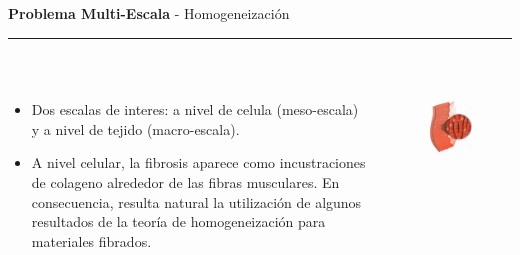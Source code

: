 \documentclass[11pt]{beamer}
\begin{document}
\begin{frame}[t]
	\vspace*{0.5 cm} \textbf{Problema Multi-Escala} - Homogeneización
	\color{brown}\rule{\linewidth}{4pt} \\ [0.2 cm]
	
	\begin{columns}[T] %
		\begin{column}{.8\textwidth}
		\begin{itemize}
			\item Dos escalas de interes: a nivel de celula (meso-escala) y a nivel de tejido (macro-escala).
			\item A nivel celular, la fibrosis aparece como incustraciones de colageno alrededor de las fibras musculares. En consecuencia, resulta natural la utilización de algunos resultados de la teoría de homogeneización para materiales fibrados.

		\end{itemize}

		\end{column}%
		\hfill%
		\begin{column}{.3\textwidth}
			\begin{figure}[H]
				\centering 
				\includegraphics[height = 3.6 cm]{fig/miocitos_cardiacos}
			\end{figure}
		\end{column}%
	\end{columns}


\end{frame}
\end{document}
